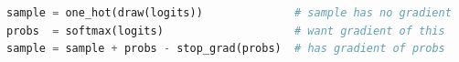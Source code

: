 \begin{algorithm}[b]
\fontsize{9.5}{12}\selectfont
\vspace*{-.8ex}
\begin{lstlisting}[language=Python]
sample = one_hot(draw(logits))              # sample has no gradient
probs  = softmax(logits)                    # want gradient of this
sample = sample + probs - stop_grad(probs)  # has gradient of probs
\end{lstlisting}
\vspace*{-.8ex}
\caption{Straight-Through Gradients with Automatic Differentiation}
\label{alg:st}
\end{algorithm}